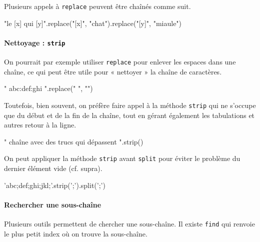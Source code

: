 Plusieurs appels à \texttt{replace} peuvent être chaînés comme suit.

\begin{idleconsole}
	\begin{pyconsole}
		"le [x] qui [y]".replace("[x]", "chat").replace("[y]", "miaule")
	\end{pyconsole}
\end{idleconsole}

\vspace{1pt}

\paragraph{Nettoyage : {\normalfont\texttt{strip}}}
On pourrait par exemple utiliser \texttt{replace} pour enlever les espaces dans une chaîne, ce qui peut être utile pour « nettoyer » la chaîne de caractères.

\begin{idleconsole}
	\begin{pyconsole}
		" abc:def:ghi ".replace(" ", "")
	\end{pyconsole}
\end{idleconsole}

Toutefois, bien souvent, on préfère faire appel à la méthode \texttt{strip} qui ne s'occupe que du début et de la fin de la chaîne, tout en gérant également les tabulations et autres retour à la ligne.

\begin{idleconsole}
	\begin{pyconsole}
		" \tune chaîne avec des trucs qui dépassent \n".strip()
	\end{pyconsole}
\end{idleconsole}

On peut appliquer la méthode \texttt{strip} avant \texttt{split} pour éviter le problème du dernier élément vide (cf. supra).

\begin{idleconsole}
	\begin{pyconsole}
		'abc;def;ghi;jkl;'.strip(';').split(';')
	\end{pyconsole}
\end{idleconsole}

\paragraph{Rechercher une sous-chaîne}
Plusieurs outils permettent de chercher une sous-chaîne. Il existe \texttt{find} qui renvoie le plus petit index où on trouve la sous-chaîne.

